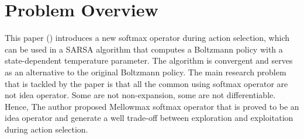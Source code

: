 \section{Problem Overview}
\label{section:intro}
This paper (\cite{asadi2017alternative}) introduces a new softmax operator during action selection, which can be used in a SARSA algorithm that computes a Boltzmann policy with a state-dependent temperature parameter. The algorithm is convergent and serves as an alternative to the original Boltzmann policy. The main research problem that is tackled by the paper is that all the common using softmax operator are not idea operator. Some are not non-expansion, some are not differentiable. Hence, The author proposed Mellowmax softmax operator that is proved to be an idea operator and generate a well trade-off between exploration and exploitation during action selection.
